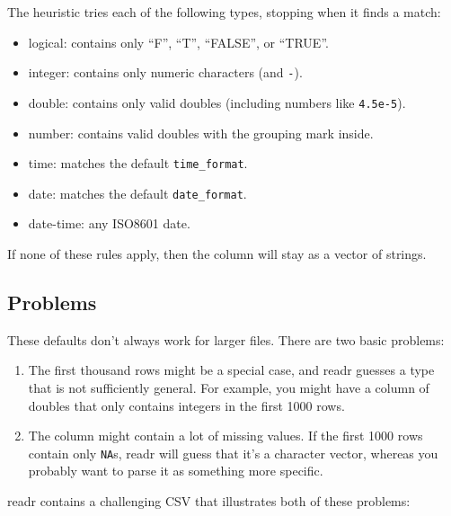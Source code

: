 \documentclass[]{book}
\providecommand{\tightlist}{%
  \setlength{\itemsep}{0pt}\setlength{\parskip}{0pt}}
\begin{document}
The heuristic tries each of the following types, stopping when it finds
a match:

\begin{itemize}
\tightlist
\item
  logical: contains only ``F'', ``T'', ``FALSE'', or ``TRUE''.
\item
  integer: contains only numeric characters (and \texttt{-}).
\item
  double: contains only valid doubles (including numbers like
  \texttt{4.5e-5}).
\item
  number: contains valid doubles with the grouping mark inside.
\item
  time: matches the default \texttt{time\_format}.
\item
  date: matches the default \texttt{date\_format}.
\item
  date-time: any ISO8601 date.
\end{itemize}

If none of these rules apply, then the column will stay as a vector of
strings.

\subsection{Problems}\label{problems}

These defaults don't always work for larger files. There are two basic
problems:

\begin{enumerate}
\def\labelenumi{\arabic{enumi}.}
\item
  The first thousand rows might be a special case, and readr guesses a
  type that is not sufficiently general. For example, you might have a
  column of doubles that only contains integers in the first 1000 rows.
\item
  The column might contain a lot of missing values. If the first 1000
  rows contain only \texttt{NA}s, readr will guess that it's a character
  vector, whereas you probably want to parse it as something more
  specific.
\end{enumerate}

readr contains a challenging CSV that illustrates both of these
problems:
\end{document}

